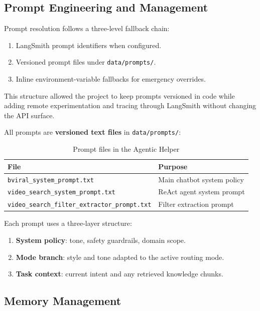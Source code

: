 \subsection{Prompt Engineering and Management}

Prompt resolution follows a three-level fallback chain:
\begin{enumerate}
  \item LangSmith prompt identifiers when configured.
  \item Versioned prompt files under \texttt{data/prompts/}.
  \item Inline environment-variable fallbacks for emergency overrides.
\end{enumerate}

This structure allowed the project to keep prompts versioned in code while adding remote
experimentation and tracing through LangSmith without changing the API surface.

All prompts are \textbf{versioned text files} in \texttt{data/prompts/}:

\begin{table}[H]
\centering
\caption{Prompt files in the Agentic Helper}
\begin{tabular}{ll}
\toprule
\textbf{File} & \textbf{Purpose} \\
\midrule
\texttt{bviral\_system\_prompt.txt}                   & Main chatbot system policy \\
\texttt{video\_search\_system\_prompt.txt}             & ReAct agent system prompt \\
\texttt{video\_search\_filter\_extractor\_prompt.txt} & Filter extraction prompt \\
\bottomrule
\end{tabular}
\end{table}

Each prompt uses a three-layer structure:
\begin{enumerate}
  \item \textbf{System policy}: tone, safety guardrails, domain scope.
  \item \textbf{Mode branch}: style and tone adapted to the active routing mode.
  \item \textbf{Task context}: current intent and any retrieved knowledge chunks.
\end{enumerate}

\subsection{Memory Management}

